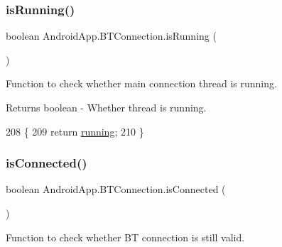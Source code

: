 \mbox{\label{class_android_app_1_1_b_t_connection_a88abb39350aef278f15e54be4d0d1df3}} 
\subsubsection{\texorpdfstring{is\+Running()}{isRunning()}}
{\footnotesize\ttfamily boolean Android\+App.\+B\+T\+Connection.\+is\+Running (\begin{DoxyParamCaption}{ }\end{DoxyParamCaption})\hspace{0.3cm}{\ttfamily [inline]}}



Function to check whether main connection thread is running. 

\begin{DoxyReturn}{Returns}
boolean -\/ Whether thread is running. 
\end{DoxyReturn}

\begin{DoxyCode}
208                                \{
209         \textcolor{keywordflow}{return} \hyperlink{class_android_app_1_1_b_t_connection_ace01a7a97f5d1abccb61a5d6c6ad9295}{running};
210     \}
\end{DoxyCode}
\mbox{\label{class_android_app_1_1_b_t_connection_a1c91fcddfe9f3b69cd0141742103191a}} 
\subsubsection{\texorpdfstring{is\+Connected()}{isConnected()}}
{\footnotesize\ttfamily boolean Android\+App.\+B\+T\+Connection.\+is\+Connected (\begin{DoxyParamCaption}{ }\end{DoxyParamCaption})\hspace{0.3cm}{\ttfamily [inline]}}



Function to check whether BT connection is still valid. 

